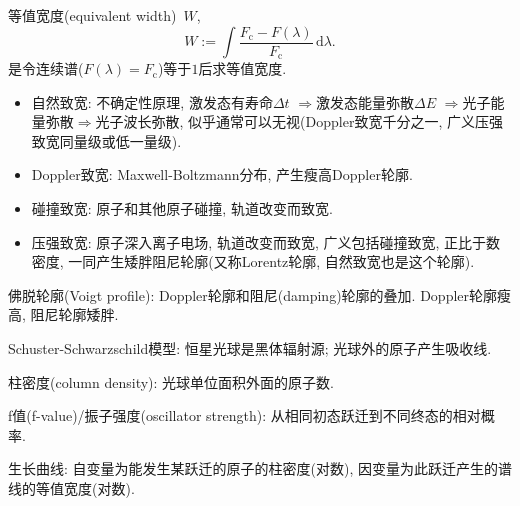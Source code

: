 等值宽度(equivalent width)~$W$,
\begin{equation*}
    W:=\int\frac{F_\text{c}-F(\lambda)}{F_\text{c}}\,\mathrm{d}\lambda.
\end{equation*}
是令连续谱($F(\lambda)=F_\text{c}$)等于$1$后求等值宽度.

\begin{itemize}
    \item 自然致宽: 不确定性原理, 激发态有寿命$\Delta t$ $\Rightarrow$激发态能量弥散$\Delta E$ $\Rightarrow$光子能量弥散$\Rightarrow$光子波长弥散, 似乎通常可以无视(Doppler致宽千分之一, 广义压强致宽同量级或低一量级).
    \item Doppler致宽: Maxwell-Boltzmann分布, 产生瘦高Doppler轮廓.
    \item 碰撞致宽: 原子和其他原子碰撞, 轨道改变而致宽.
    \item 压强致宽: 原子深入离子电场, 轨道改变而致宽, 广义包括碰撞致宽, 正比于数密度, 一同产生矮胖阻尼轮廓(又称Lorentz轮廓, 自然致宽也是这个轮廓).
\end{itemize}
佛脱轮廓(Voigt profile): Doppler轮廓和阻尼(damping)轮廓的叠加. Doppler轮廓瘦高, 阻尼轮廓矮胖.

Schuster-Schwarzschild模型: 恒星光球是黑体辐射源; 光球外的原子产生吸收线.

柱密度(column density): 光球单位面积外面的原子数.

f值(f-value)/振子强度(oscillator strength): 从相同初态跃迁到不同终态的相对概率.

生长曲线: 自变量为能发生某跃迁的原子的柱密度(对数), 因变量为此跃迁产生的谱线的等值宽度(对数).

